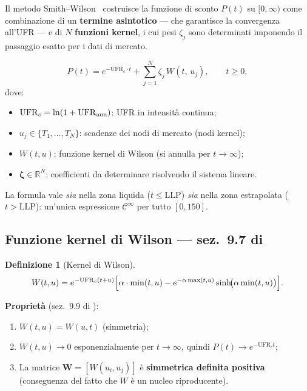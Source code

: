 \documentclass[11pt,a4paper]{article}
\theoremstyle{plain}
\theoremstyle{definition}
\newtheorem{definizione}[teorema]{Definizione}
\theoremstyle{remark}
\newcommand{\R}{\mathbb{R}}
\newcommand{\UFR}{\ensuremath{\mathrm{UFR}}}
\newcommand{\LLP}{\ensuremath{\mathrm{LLP}}}
\newcommand{\bfzeta}{\bm{\zeta}}
\newcommand{\Wmat}{\mathbf{W}}
\begin{document}
Il metodo Smith--Wilson~\cite{smithwilson2001} costruisce la funzione di sconto
$P(t)$ su $[0,\infty)$ come combinazione di un \textbf{termine asintotico} ---
che garantisce la convergenza all'UFR --- e di $N$ \textbf{funzioni kernel},
i cui pesi $\zeta_j$ sono determinati imponendo il passaggio esatto per i dati di mercato.

\begin{keybox}
\begin{equation}
  \label{eq:sw_main}
  P(t) = e^{-\UFR_c \cdot t} + \sum_{j=1}^{N}\zeta_j\,W(t,\,u_j),
  \qquad t \ge 0,
\end{equation}
dove:
\begin{itemize}
  \item $\UFR_c = \ln(1 + \UFR_{\rm ann})$: UFR in intensit\`a continua;
  \item $u_j \in \{T_1,\ldots,T_N\}$: scadenze dei nodi di mercato (nodi kernel);
  \item $W(t,u)$: funzione kernel di Wilson (si annulla per $t\to\infty$);
  \item $\bfzeta \in \R^N$: coefficienti da determinare risolvendo il sistema lineare.
\end{itemize}
\end{keybox}

La formula vale \emph{sia} nella zona liquida ($t \le \LLP$) \emph{sia} nella zona
estrapolata ($t > \LLP$): un'unica espressione $\mathcal{C}^\infty$ per tutto $[0, 150]$.

\subsection{Funzione kernel di Wilson --- sez.~9.7 di \cite{eiopa2025}}

\begin{definizione}[Kernel di Wilson]
\begin{equation}
  \label{eq:kernel}
  W(t,u) = e^{-\UFR_c(t+u)}\Bigl[
    \alpha\cdot\min(t,u)
    - e^{-\alpha\max(t,u)}\sinh\!\bigl(\alpha\min(t,u)\bigr)
  \Bigr].
\end{equation}
\end{definizione}

\textbf{Propriet\`a} (sez.~9.9 di \cite{eiopa2025}):
\begin{enumerate}
  \item $W(t,u)=W(u,t)$ (simmetria);
  \item $W(t,u)\to 0$ esponenzialmente per $t\to\infty$, quindi $P(t)\to e^{-\UFR_c t}$;
  \item La matrice $\Wmat=[W(u_i,u_j)]$ \`e \textbf{simmetrica definita positiva}
        (conseguenza del fatto che $W$ \`e un nucleo riproducente).
\end{enumerate}
\end{document}
